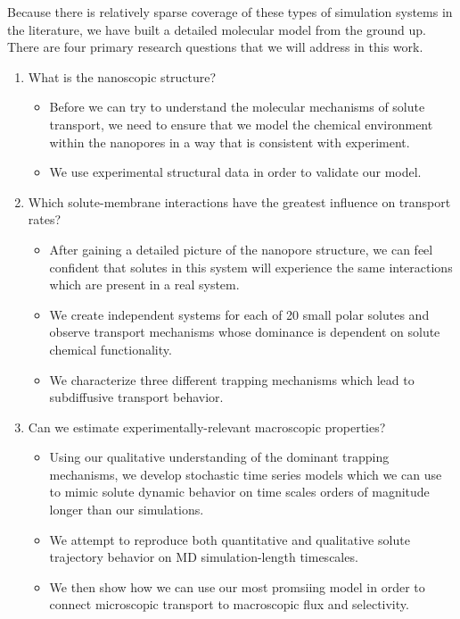   Because there is relatively sparse coverage of these types of simulation systems in 
  the literature, we have built a detailed molecular model from the ground up. There 
  are four primary research questions that we will address in this work.
  \begin{enumerate}
    \item What is the nanoscopic structure?
    	\begin{itemize}
    	  \item Before we can try to understand the molecular mechanisms of solute
    	  transport, we need to ensure that we model the chemical environment
    	  within the nanopores in a way that is consistent with experiment.
    	  \item We use experimental structural data in order to validate our model.
    	\end{itemize}
    \item Which solute-membrane interactions have the greatest influence on transport rates?
    	\begin{itemize}
    	  \item After gaining a detailed picture of the nanopore structure, we can 
    	  feel confident that solutes in this system will experience the same 
    	  interactions which are present in a real system.
    	  \item We create independent systems for each of 20 small polar solutes 
    	  and observe transport mechanisms whose dominance is dependent on
    	  solute chemical functionality.
    	  \item We characterize three different trapping mechanisms which lead
    	  to subdiffusive transport behavior.
    	\end{itemize}
    \item Can we estimate experimentally-relevant macroscopic properties?
    	\begin{itemize}
    	  \item Using our qualitative understanding of the dominant trapping mechanisms,
    	  we develop stochastic time series models which we can use to mimic solute dynamic
    	  behavior on time scales orders of magnitude longer than our simulations. 
    	  \item We attempt to reproduce both quantitative and qualitative solute trajectory
    	  behavior on MD simulation-length timescales.
    	  \item We then show how we can use our most promsiing model in order to connect 
    	  microscopic transport to macroscopic flux and selectivity.

\end{itemize}
\end{enumerate}
